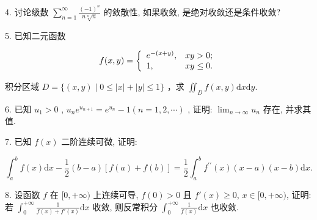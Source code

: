 \documentclass{examcollection}
\renewcommand{\displayformula}[1]{\[#1\]}
\begin{document}
{\begin{minipage}{\textwidth}
4. 讨论级数 $\sum_{n=1}^{\infty} \frac{(-1)^n}{n\sqrt[n]{n}}$ 的敛散性, 如果收敛, 是绝对收敛还是条件收敛?\par
5. 已知二元函数\par
\displayformula{f (x, y) = \left\{ \begin{array}{l l} e ^ {- (x + y)}, & x y > 0; \\ 1, & x y \leq 0. \end{array} \right.}\par
积分区域 $D = \{(x,y)\mid 0\leq |x| + |y|\leq 1\}$ ，求 $\iint_{D}f(x,y)\mathrm{d}x\mathrm{d}y.$\par
6. 已知  $u_{1}>0$ ,  $u_{n}e^{u_{n+1}}=e^{u_{n}}-1(n=1,2,\cdots)$ , 证明:  $\lim_{n\to\infty}u_{n}$  存在, 并求其值.\par
7. 已知 $f(x)$ 二阶连续可微, 证明:\par
\displayformula{\int_ {a} ^ {b} f (x) \mathrm{d} x - \frac {1}{2} (b - a) [ f (a) + f (b) ] = \frac {1}{2} \int_ {a} ^ {b} f ^ {\prime \prime} (x) (x - a) (x - b) \mathrm{d} x.}\par
8. 设函数 $f$ 在 $[0, +\infty)$ 上连续可导, $f(0) > 0$ 且 $f'(x) \geq 0$, $x \in [0, +\infty)$, 证明: 若 $\int_0^{+\infty} \frac{1}{f(x) + f'(x)} \mathrm{d}x$ 收敛, 则反常积分 $\int_0^{+\infty} \frac{1}{f(x)} \mathrm{d}x$ 也收敛.\par
\end{minipage}}
\ifdim\dimexpr\ht\proofbox+\dp\proofbox\relax>\textheight
\noindent\resizebox{!}{\textheight}{\usebox{\proofbox}}\else\noindent\usebox{\proofbox}\fi\clearpage
\end{document}
